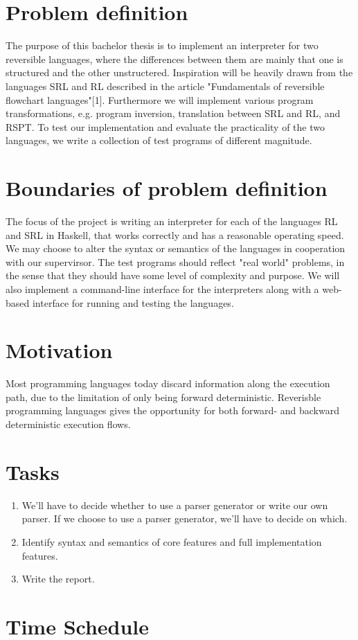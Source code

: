 \section{Problem definition}
\label{sec:problem_definition}
The purpose of this bachelor thesis is to implement an interpreter for two reversible languages, where the differences between them are mainly that one is structured and the other unstructered.
Inspiration will be heavily drawn from the languages SRL and RL described in the article "Fundamentals of reversible flowchart languages"[1].
Furthermore we will implement various program transformations, e.g. program inversion, translation between SRL and RL, and RSPT.
To test our implementation and evaluate the practicality of the two languages, we write a collection of test programs of different magnitude.

\section{Boundaries of problem definition}
\label{sec:boundaries_of_problem_definition}

The focus of the project is writing an interpreter for each of the languages RL and SRL in Haskell, that works correctly and has a reasonable operating speed.
We may choose to alter the syntax or semantics of the languages in cooperation with our supervirsor.
The test programs should reflect "real world" problems, in the sense that they should have some level of complexity and purpose.
We will also implement a command-line interface for the interpreters along with a web-based interface for running and testing the languages.

\section{Motivation}
\label{sec:motivation}
Most programming languages today discard information along the execution path, due to the limitation of only being forward deterministic. Reverisble programming languages gives the opportunity for both forward- and backward deterministic execution flows.

\section{Tasks}
\label{sec:tasks}

\begin{enumerate}

  \item We'll have to decide whether to use a parser generator or write our own parser. If we choose to use a parser generator, we'll have to decide on which.

  \item Identify syntax and semantics of core features and full implementation features.

  \item Write the report.

\end{enumerate}

\section{Time Schedule}
\label{sec:time_schedule}

